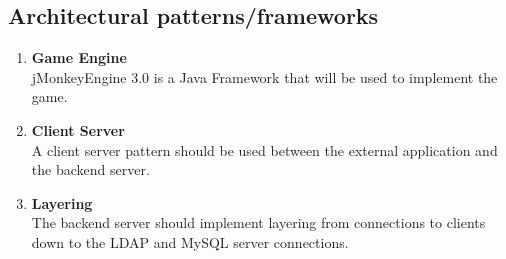 \documentclass[letterpaper]{article}
\begin{document}
			\subsection*{Architectural patterns/frameworks}
			\vspace{0.1in}
			
				\begin{enumerate}
					\item \textbf{Game Engine}
					\\jMonkeyEngine 3.0 is a Java Framework that will be used to implement the game.
					
					\item \textbf{Client Server}
					\\A client server pattern should be used between the external application and the backend server.
					
					\item \textbf{Layering}
					\\The backend server should implement layering from connections to clients down to the LDAP and MySQL server connections.
				\end{enumerate}
			
		\vspace{0.2in}
		
\end{document}
